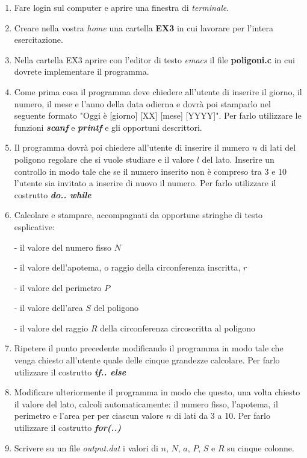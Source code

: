 \documentclass[11pt]{article}
\begin{document}
\begin{enumerate}
\item Fare login sul computer e aprire una finestra di {\em terminale}.
\item Creare nella vostra \emph{home} una cartella  \textbf{EX3} in cui lavorare per l'intera esercitazione.
\item Nella cartella EX3 aprire con l'editor  di testo \emph{emacs} il file \textbf{poligoni.c} in cui dovrete implementare il programma.
\item Come prima cosa il programma deve chiedere all'utente di inserire il giorno, il numero,  il mese e l'anno della data odierna e dovr\`a poi stamparlo nel seguente formato "Oggi è [giorno] [XX] [mese] [YYYY]". Per farlo utilizzare le funzioni \emph{\textbf{scanf}} e \emph{\textbf{printf}} e gli opportuni descrittori.

\item Il programma dovr\`a poi chiedere all'utente di inserire il numero $n$ di lati del poligono regolare che si vuole studiare e il valore $l$ del lato. Inserire un controllo in modo tale che se il numero inserito non \`e compreso tra 3 e 10 l'utente sia invitato a inserire di nuovo il numero. Per farlo utilizzare il costrutto \emph{\textbf{do.. while}}

\item Calcolare e stampare, accompagnati da opportune stringhe di testo esplicative:

- il valore del numero fisso $N$ 

- il valore dell'apotema, o raggio della circonferenza inscritta, $r$

- il valore del perimetro $P$ 

- il valore dell'area $S$ del poligono

- il valore del raggio $R$ della circonferenza circoscritta al poligono 

\item Ripetere il punto precedente modificando il programma in modo tale che venga chiesto all'utente quale delle cinque grandezze calcolare. Per farlo utilizzare il costrutto \emph{\textbf{if.. else}}

\item Modificare ulteriormente il programma in modo che questo, una volta chiesto il valore del lato, calcoli automaticamente: il numero fisso, l'apotema, il perimetro e l'area per per ciascun valore $n$ di lati da 3 a 10. Per farlo utilizzare il costrutto \emph{\textbf{for(..)}}

\item Scrivere su un file \emph{output.dat} i valori di $n$, $N$, $a$, $P$, $S$ e $R$ su cinque colonne.
\end{enumerate}
\end{document}
